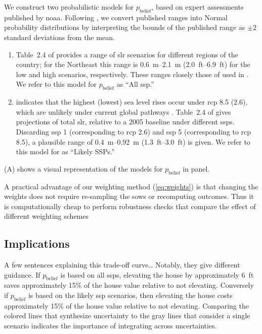 \documentclass[11pt]{article}
\newcommand{\james}[1]{\todo[color=giallo, textcolor=nero]{\textbf{ATTN James:~}#1}} %
\begin{document}
We construct two probabilistic models for $p_\text{belief}$, based on expert assessments published by \gls{noaa}.
Following \citet{fuller_inversion:2017}, we convert published ranges into Normal probability distributions by interpreting the bounds of the published range as $\pm 2$ standard deviations from the mean.
\begin{enumerate}
    \item Table~2.4 of \citet{sweet_slr:2022} provides a range of \gls{slr} scenarios for different regions of the country; for the Northeast this range is \SIrange{0.6}{2.1}{\meter} (\SIrange{2.0}{6.9}{ft}) for the low and high scenarios, respectively. These ranges closely those of \citet{pfeffer_sealevel:2008} used in \citet{fuller_inversion:2017}. We refer to this model for $p_\text{belief}$ as ``All \gls{ssp}.''
    \item {} indicates that the highest (lowest) sea level rises occur under \gls{rcp} 8.5 (2.6), which are unlikely under current global pathways \citep{hausfather_scenarios:2020}. Table~2.4 of \citet{sweet_slr:2022} gives projections of total \gls{slr}, relative to a 2005 baseline under different \glspl{ssp}. Discarding \gls{ssp} 1 (corresponding to \gls{rcp} 2.6) and \gls{ssp} 5 (corresponding to \gls{rcp} 8.5), a plausible range of \SIrange{0.4}{0.92}{\meter} (\SIrange{1.3}{3.0}{ft}) is given. We refer to this model for as ``Likely SSPs.''
\end{enumerate}
(A) shows a visual representation of the models for $p_\text{belief}$ in panel.

A practical advantage of our weighting method (\cref{eq:weights}) is that changing the weights does not require re-sampling the \glspl{sow} or recomputing outcomes.
Thus it is computationally cheap to perform robustness checks that compare the effect of different weighting schemes


\subsection{Implications}

A few sentences explaining this trade-off curve\ldots\james{Add more}
Notably, they give different guidance.
If $p_\text{belief}$ is based on all \glspl{ssp}, elevating the house by approximately \SI{6}{ft} saves approximately 15\% of the house value relative to not elevating.
Conversely if $p_\text{belief}$ is based on the likely \gls{ssp} scenarios, then elevating the house costs approximately 15\% of the house value relative to not elevating.
Comparing the colored lines that synthesize uncertainty to the gray lines that consider a single scenario indicates the importance of integrating across uncertainties.
\end{document}
